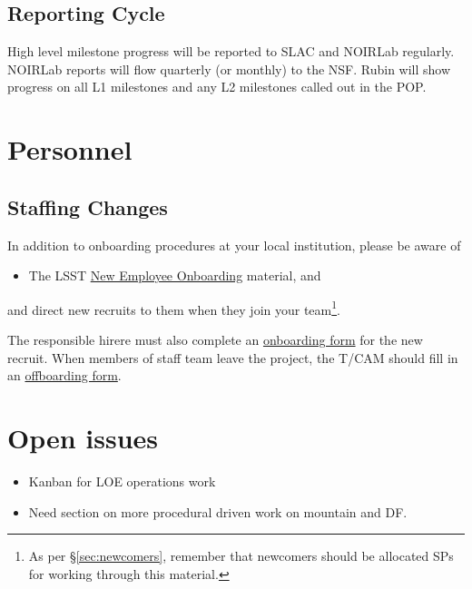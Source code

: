 \subsection{Reporting Cycle}

High level milestone progress will be reported to SLAC and NOIRLab regularly.
NOIRLab reports will flow quarterly (or monthly) to the NSF.
Rubin will show progress on all L1 milestones and any L2 milestones called out in the POP.


\section{Personnel}

\subsection{Staffing Changes}
\label{sec:staffing}

In addition to onboarding procedures at your local institution, please
be aware of

\begin{itemize}
\item The \gls{LSST} \href{https://project.lsst.org/onboarding}{New Employee
  Onboarding} material, and
\end{itemize}

and direct new recruits to them when they join your team\footnote{As per \S\ref{sec:newcomers}, remember that newcomers should be allocated \glspl{SP} for working through this material.}.

The responsible hirere must also complete an \href{https://project.lsst.org/onboarding/form}{onboarding form} for the new recruit.
When members of staff team leave the project, the \gls{T/CAM} should fill in an \href{https://project.lsst.org/onboarding/offboarding_form}{offboarding form}.


\section{Open issues}

\begin{itemize}
\item Kanban for \gls{LOE} operations work
\item Need section on more procedural driven work on mountain and DF.
\end{itemize}
